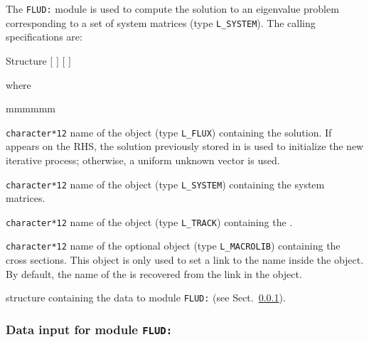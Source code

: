 The {\tt FLUD:} module is used to compute the solution to an eigenvalue problem corresponding to a set of system matrices (type {\tt L\_SYSTEM}). The calling specifications are:

\begin{DataStructure}{Structure }
 \moc{:=}  $[$  $]$   $[$  $]$ \moc{::} 
\end{DataStructure}

\noindent where
\begin{ListeDeDescription}{mmmmmm}

\item[\dusa{FLUX}] {\tt character*12} name of the  object (type {\tt L\_FLUX}) containing the solution. If  appears on the RHS, the solution previously stored in  is used to initialize the new iterative process; otherwise, a uniform unknown vector is used.

\item[\dusa{SYST}] {\tt character*12} name of the  object (type {\tt L\_SYSTEM}) containing the system matrices.

\item[\dusa{TRACK}] {\tt character*12} name of the  object (type {\tt L\_TRACK}) containing the .

\item[\dusa{MACRO}] {\tt character*12} name of the optional  object (type {\tt L\_MACROLIB}) containing the cross sections. This
object is only used to set a link to the  name inside the  object. By default, the name of the  is recovered
from the link in the  object.

\item[\dstr{flud\_data}] structure containing the data to module {\tt FLUD:} (see Sect.~\ref{sect:fld_data}).

\end{ListeDeDescription}

\vskip 0.2cm

\subsubsection{Data input for module {\tt FLUD:}}\label{sect:fld_data}

